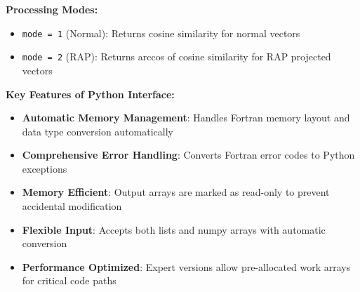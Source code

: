 \documentclass[11pt]{article}
\begin{document}
\textbf{Processing Modes:}
\begin{itemize}
	\item \texttt{mode = 1} (Normal): Returns cosine similarity for normal vectors
	      
	\item \texttt{mode = 2} (RAP): Returns arccos of cosine similarity for RAP projected
	      vectors
\end{itemize}

\textbf{Key Features of Python Interface:}
\begin{itemize}
	\item \textbf{Automatic Memory Management}: Handles Fortran memory layout and
	      data type conversion automatically
	      
	\item \textbf{Comprehensive Error Handling}: Converts Fortran error codes to
	      Python exceptions
	      
	\item \textbf{Memory Efficient}: Output arrays are marked as read-only to prevent
	      accidental modification
	      
	\item \textbf{Flexible Input}: Accepts both lists and numpy arrays with automatic
	      conversion
	      
	\item \textbf{Performance Optimized}: Expert versions allow pre-allocated work
	      arrays for critical code paths
\end{itemize}
\end{document}
